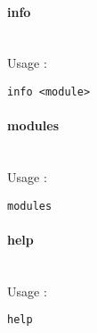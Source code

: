 \paragraph{info} \hspace{0pt} \\
Usage :
\begin{verbatim}
info <module>
\end{verbatim}
\paragraph{modules} \hspace{0pt} \\
Usage :
\begin{verbatim}
modules
\end{verbatim}
\paragraph{help} \hspace{0pt} \\
Usage :
\begin{verbatim}
help
\end{verbatim}
